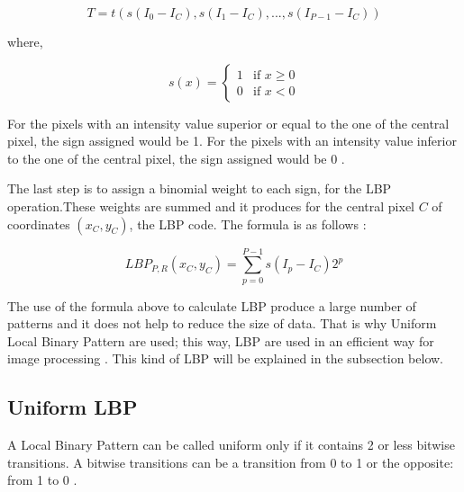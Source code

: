 \begin{equation}
   T = t(s(I_0 - I_C), s(I_1 - I_C), ..., s(I_{P-1} - I_C))
\end{equation}

\noindent where,
\newline

\begin{equation}
s(x) = \left\{
    \begin{array}{ll}
        1 & \mbox{if } x\geq0 \\
        0 & \mbox{if } x < 0
    \end{array}
\right.
\end{equation}

\vspace{\baselineskip}
\noindent For the pixels with an intensity value superior or equal to the one of the central pixel, the sign assigned would be 1. For the pixels with an intensity value inferior to the one of the central pixel, the sign assigned would be 0 \cite{GAN08}.
\newline

\noindent The last step is to assign a binomial weight to each sign, for the LBP operation.These weights are summed and it produces for the central pixel $ C $ of coordinates $ (x_C,y_C) $, the LBP code. The formula is as follows \cite{GAN08}:
\newline

\begin{equation}
   LBP_{P,R}(x_C,y_C) = \sum_{p = 0}^{P-1} s(I_p - I_C)2^p
\end{equation}

\vspace{\baselineskip}
\noindent The use of the formula above to calculate LBP produce a large number of patterns and it does not help to reduce the size of data. That is why Uniform Local Binary Pattern are used; this way, LBP are used in an efficient way for image processing \cite{GAN08}. This kind of LBP will be explained in the subsection below.
\newline

\subsection{Uniform LBP}

\vspace{\baselineskip}
\noindent A Local Binary Pattern can be called uniform only if it contains 2 or less bitwise transitions. A bitwise transitions can be a transition from 0 to 1 or the opposite: from 1 to 0 \cite{GAN08}. 
\newline

